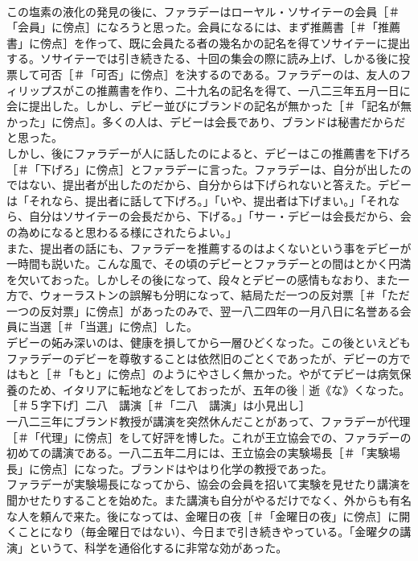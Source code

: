 \documentclass[8pt]{extreport}
\begin{document}
\begin{CJK}{UTF8}{min}
\\	この塩素の液化の発見の後に、ファラデーはローヤル・ソサイテーの会員［＃「会員」に傍点］になろうと思った。会員になるには、まず推薦書［＃「推薦書」に傍点］を作って、既に会員たる者の幾名かの記名を得てソサイテーに提出する。ソサイテーでは引き続きたる、十回の集会の際に読み上げ、しかる後に投票して可否［＃「可否」に傍点］を決するのである。ファラデーのは、友人のフィリップスがこの推薦書を作り、二十九名の記名を得て、一八二三年五月一日に会に提出した。しかし、デビー並びにブランドの記名が無かった［＃「記名が無かった」に傍点］。多くの人は、デビーは会長であり、ブランドは秘書だからだと思った。
\\	しかし、後にファラデーが人に話したのによると、デビーはこの推薦書を下げろ［＃「下げろ」に傍点］とファラデーに言った。ファラデーは、自分が出したのではない、提出者が出したのだから、自分からは下げられないと答えた。デビーは「それなら、提出者に話して下げろ。」「いや、提出者は下げまい。」「それなら、自分はソサイテーの会長だから、下げる。」「サー・デビーは会長だから、会の為めになると思わるる様にされたらよい。」
\\	また、提出者の話にも、ファラデーを推薦するのはよくないという事をデビーが一時間も説いた。こんな風で、その頃のデビーとファラデーとの間はとかく円満を欠いておった。しかしその後になって、段々とデビーの感情もなおり、また一方で、ウォーラストンの誤解も分明になって、結局ただ一つの反対票［＃「ただ一つの反対票」に傍点］があったのみで、翌一八二四年の一月八日に名誉ある会員に当選［＃「当選」に傍点］した。
\\	デビーの妬み深いのは、健康を損してから一層ひどくなった。この後といえどもファラデーのデビーを尊敬することは依然旧のごとくであったが、デビーの方ではもと［＃「もと」に傍点］のようにやさしく無かった。やがてデビーは病気保養のため、イタリアに転地などをしておったが、五年の後｜逝《な》くなった。
\\	［＃５字下げ］二八　講演［＃「二八　講演」は小見出し］
\\	一八二三年にブランド教授が講演を突然休んだことがあって、ファラデーが代理［＃「代理」に傍点］をして好評を博した。これが王立協会での、ファラデーの初めての講演である。一八二五年二月には、王立協会の実験場長［＃「実験場長」に傍点］になった。ブランドはやはり化学の教授であった。
\\	ファラデーが実験場長になってから、協会の会員を招いて実験を見せたり講演を聞かせたりすることを始めた。また講演も自分がやるだけでなく、外からも有名な人を頼んで来た。後になっては、金曜日の夜［＃「金曜日の夜」に傍点］に開くことになり（毎金曜日ではない）、今日まで引き続きやっている。「金曜夕の講演」というて、科学を通俗化するに非常な効があった。

\end{CJK}
\end{document}

